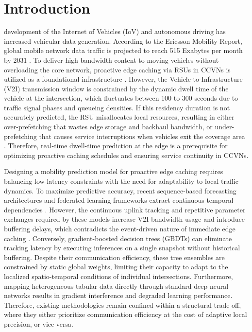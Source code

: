 \documentclass[journal]{IEEEtran}
\begin{document}
\IEEEpeerreviewmaketitle


\section{Introduction}\label{sec:introduction}

 development of the Internet of Vehicles (IoV) and autonomous driving has increased vehicular data generation. According to the Ericsson Mobility Report, global mobile network data traffic is projected to reach 515 Exabytes per month by 2031 \cite{1}. To deliver high-bandwidth content to moving vehicles without overloading the core network, proactive edge caching via RSUs in CCVNs is utilized as a foundational infrastructure \cite{2,3,4}. However, the Vehicle-to-Infrastructure (V2I) transmission window is constrained by the dynamic dwell time of the vehicle at the intersection, which fluctuates between 100 to 300 seconds due to traffic signal phases and queueing densities. If this residency duration is not accurately predicted, the RSU misallocates local resources, resulting in either over-prefetching that wastes edge storage and backhaul bandwidth, or under-prefetching that causes service interruptions when vehicles exit the coverage area \cite{5,6,7}. Therefore, real-time dwell-time prediction at the edge is a prerequisite for optimizing proactive caching schedules and ensuring service continuity in CCVNs.

Designing a mobility prediction model for proactive edge caching requires balancing low-latency constraints with the need for adaptability to local traffic dynamics. To maximize predictive accuracy, recent sequence-based forecasting architectures and federated learning frameworks extract continuous temporal dependencies \cite{8,9}. However, the continuous uplink tracking and repetitive parameter exchanges required by these models increase V2I bandwidth usage and introduce buffering delays, which contradicts the event-driven nature of immediate edge caching \cite{10,11}. Conversely, gradient-boosted decision trees (GBDTs) can eliminate tracking latency by executing inferences on a single snapshot without historical buffering. Despite their communication efficiency, these tree ensembles are constrained by static global weights, limiting their capacity to adapt to the localized spatio-temporal conditions of individual intersections. Furthermore, mapping heterogeneous tabular data directly through standard deep neural networks results in gradient interference and degraded learning performance. Therefore, existing methodologies remain confined within a structural trade-off, where they either prioritize communication efficiency at the cost of adaptive local precision, or vice versa.
\end{document}

